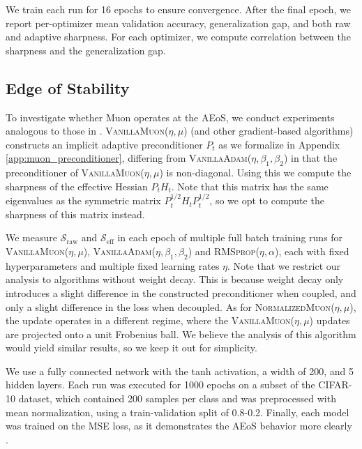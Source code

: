 \documentclass{article}
\newcommand{\TODO}[1]{{\color{red}#1}}
\theoremstyle{plain}
\theoremstyle{definition}
\theoremstyle{remark}
\begin{document}
We train each run for 16 epochs to ensure convergence. After the final epoch, we report per-optimizer mean validation accuracy, generalization gap, and both raw and adaptive sharpness. For each optimizer, we compute correlation between the sharpness and the generalization gap.


\subsection{Edge of Stability}

To investigate whether Muon operates at the AEoS, we conduct experiments analogous to those in \cite{cohen2024adaptivegradientmethodsedge}. \textsc{VanillaMuon}($\eta, \mu$) (and other gradient-based algorithms) constructs an implicit adaptive preconditioner $P_t$ as we formalize in Appendix \ref{app:muon_preconditioner}, differing from \textsc{VanillaAdam}($\eta, \beta_1, \beta_2$) in that the preconditioner of \textsc{VanillaMuon}($\eta, \mu$) is non-diagonal. Using this we compute the sharpness of the effective Hessian $P_tH_t$. Note that this matrix has the same eigenvalues as the symmetric matrix $P_t^{1/2}H_tP_t^{1/2}$, so we opt to compute the sharpness of this matrix instead.

We measure $\mathcal{S}_\text{raw}$ and $\mathcal{S}_\text{eff}$ in each epoch of multiple full batch training runs for \textsc{VanillaMuon}($\eta, \mu$), \textsc{VanillaAdam}($\eta, \beta_1, \beta_2$) and \textsc{RMSprop}($\eta, \alpha$), each with fixed hyperparameters and multiple fixed learning rates $\eta$. Note that we restrict our analysis to algorithms without weight decay. This is because weight decay only introduces a slight difference in the constructed preconditioner when coupled, and only a slight difference in the loss when decoupled. As for \textsc{NormalizedMuon}($\eta, \mu$), the update operates in a different regime, where the \textsc{VanillaMuon}($\eta, \mu$) updates are projected onto a unit Frobenius ball. We believe the analysis of this algorithm would yield similar results, so we keep it out for simplicity.

We use a fully connected network with the tanh activation, a width of 200, and 5 hidden layers. Each run was executed for 1000 epochs on a subset of the CIFAR-10 dataset, which contained 200 samples per class and was preprocessed with mean normalization, using a train-validation split of 0.8-0.2. Finally, each model was trained on the MSE loss, as it demonstrates the AEoS behavior more clearly \cite{cohen2021gdeos}.
\end{document}
